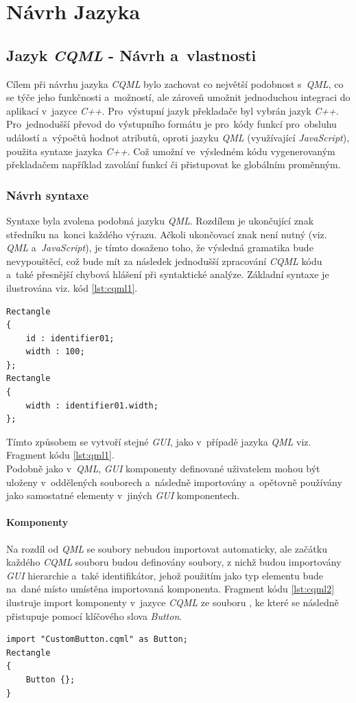\documentclass[11pt,twoside,a4paper]{book}
\begin{document}
\chapter{\label{CH:CQMLDes}Návrh Jazyka}
\section{\label{SEC:CQML}Jazyk \textit{CQML} - Návrh a~vlastnosti}
Cílem při návrhu jazyka \textit{CQML} bylo zachovat co největší podobnost s~\textit{QML}, co se týče jeho funkčnosti a~možností, ale zároveň umožnit jednoduchou integraci do aplikací v~jazyce \textit{C++}. Pro~výstupní jazyk překladače byl vybrán jazyk \textit{C++}. Pro~jednodušší převod do výstupního formátu je pro~kódy funkcí pro~obsluhu událostí a~výpočtů hodnot atributů, oproti jazyku \textit{QML} (využívající \textit{JavaScript}), použita syntaxe jazyka \textit{C++}. Což umožní ve~výsledném kódu vygenerovaným překladačem například zavolání funkcí či přistupovat ke globálním proměnným.\\
\subsection{Návrh syntaxe}
Syntaxe byla zvolena podobná jazyku \textit{QML}. Rozdílem je ukončující znak středníku na~konci každého výrazu. Ačkoli ukončovací znak není nutný (viz. \textit{QML} a~\textit{JavaScript}), je tímto dosaženo toho, že výsledná gramatika bude nevypouštěcí, což bude mít za následek jednodušší zpracování \textit{CQML} kódu a~také přesnější chybová hlášení při syntaktické analýze. Základní syntaxe je ilustrována viz. kód \ref{lst:cqml1}.
\begin{lstlisting}[frame=single,caption=Tvorba dvou jednoduchých elementů pomocí jazyka \textit{CQML}.,label=lst:cqml1]
Rectangle
{
	id : identifier01;
	width : 100;
};
Rectangle
{
	width : identifier01.width;
};
\end{lstlisting}
Tímto způsobem se vytvoří stejné \textit{GUI}, jako v~případě jazyka \textit{QML} viz. Fragment kódu \ref{lst:qml1}.\\
Podobně jako v~\textit{QML}, \textit{GUI} komponenty definované uživatelem mohou být uloženy v~oddělených souborech a~následně importovány a~opětovně používány jako samostatné elementy v~jiných \textit{GUI} komponentech. 
\subsubsection{Komponenty}
Na rozdíl od \textit{QML} se soubory nebudou importovat automaticky, ale začátku každého \textit{CQML} souboru budou definovány soubory, z nichž budou importovány \textit{GUI} hierarchie a~také identifikátor, jehož použitím jako typ elementu bude na~dané místo umístěna importovaná komponenta. Fragment kódu \ref{lst:cqml2} ilustruje import komponenty v~jazyce \textit{CQML} ze souboru , ke které se následně přistupuje pomocí klíčového slova \textit{Button}.
\begin{lstlisting}[frame=single,caption=Ukázka importu komponenty v~jazyce \textit{CQML}.,label=lst:cqml2]
import "CustomButton.cqml" as Button;
Rectangle
{
	Button {};
}
\end{lstlisting}
\end{document}
